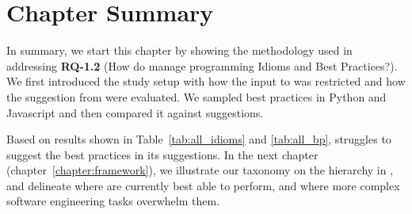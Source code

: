\section{Chapter Summary}

In summary, we start this chapter by showing the methodology used in addressing \textbf{RQ-1.2} (How do \cct{} manage programming Idioms and Best Practices?). We first introduced the study setup with how the input to \cop{} was restricted and how the suggestion from \cop{} were evaluated. We sampled best practices in Python and Javascript and then compared it against \cop{} suggestions. 

Based on results shown in Table~\ref{tab:all_idioms} and \ref{tab:all_bp}, \cop{} struggles to suggest the best practices in its suggestions. In the next chapter (chapter~\ref{chapter:framework}), we illustrate our taxonomy on the hierarchy in \AISE{}, and delineate where \cct{} are currently best able to perform, and where more complex software engineering tasks overwhelm them.